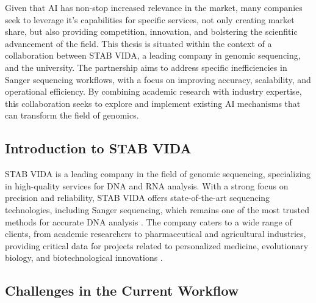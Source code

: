 Given that AI has non-stop increased relevance in the market, many companies seek to leverage it's capabilities for specific services, not only creating market share, but also providing competition, innovation, and bolstering the scienfitic advancement of the field.
This thesis is situated within the context of a collaboration between STAB VIDA, a leading company in genomic sequencing, and the university. The partnership aims to address specific inefficiencies in Sanger sequencing workflows, with a focus on improving accuracy, scalability, and operational efficiency. By combining academic research with industry expertise, this collaboration seeks to explore and implement existing AI mechanisms that can transform the field of genomics.

\subsection{Introduction to STAB VIDA}

STAB VIDA is a leading company in the field of genomic sequencing, specializing in high-quality services for DNA and RNA analysis. With a strong focus on precision and reliability, STAB VIDA offers state-of-the-art sequencing technologies, including Sanger sequencing, which remains one of the most trusted methods for accurate DNA analysis \cite{Sanger1981}. The company caters to a wide range of clients, from academic researchers to pharmaceutical and agricultural industries, providing critical data for projects related to personalized medicine, evolutionary biology, and biotechnological innovations \cite{Fujimura2015}.

\subsection{Challenges in the Current Workflow}

